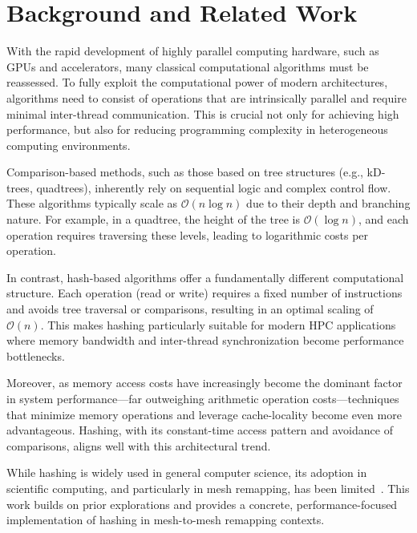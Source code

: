 \section{Background and Related Work}

With the rapid development of highly parallel computing hardware, such as GPUs and accelerators, many classical computational algorithms must be reassessed. To fully exploit the computational power of modern architectures, algorithms need to consist of operations that are intrinsically parallel and require minimal inter-thread communication. This is crucial not only for achieving high performance, but also for reducing programming complexity in heterogeneous computing environments.

Comparison-based methods, such as those based on tree structures (e.g., kD-trees, quadtrees), inherently rely on sequential logic and complex control flow. These algorithms typically scale as $\mathcal{O}(n \log n)$ due to their depth and branching nature. For example, in a quadtree, the height of the tree is $\mathcal{O}(\log n)$, and each operation requires traversing these levels, leading to logarithmic costs per operation.

In contrast, hash-based algorithms offer a fundamentally different computational structure. Each operation (read or write) requires a fixed number of instructions and avoids tree traversal or comparisons, resulting in an optimal scaling of $\mathcal{O}(n)$. This makes hashing particularly suitable for modern HPC applications where memory bandwidth and inter-thread synchronization become performance bottlenecks.

Moreover, as memory access costs have increasingly become the dominant factor in system performance—far outweighing arithmetic operation costs—techniques that minimize memory operations and leverage cache-locality become even more advantageous. Hashing, with its constant-time access pattern and avoidance of comparisons, aligns well with this architectural trend.

While hashing is widely used in general computer science, its adoption in scientific computing, and particularly in mesh remapping, has been limited~\cite{Robey2013,Alcantara2009}. This work builds on prior explorations and provides a concrete, performance-focused implementation of hashing in mesh-to-mesh remapping contexts.
